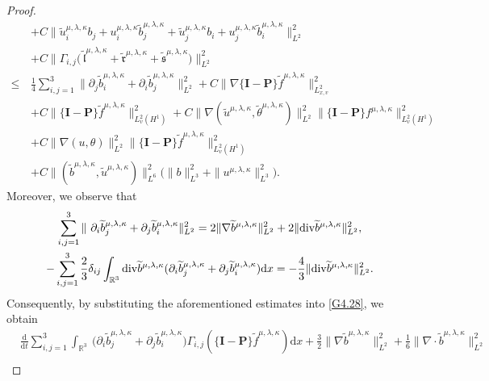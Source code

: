 \documentclass[reqno,11pt]{amsart}
\theoremstyle{plain}
\numberwithin{equation}{section}
\begin{document}
\begin{proof}
\begin{align*}
&+C\|\widetilde{u}^{\mu,\lambda,\kappa}_i b_j+u^{\mu,\lambda,\kappa}_i \widetilde{b}^{\mu,\lambda,\kappa}_j+\widetilde{u}^{\mu,\lambda,\kappa}_j b_i+u^{\mu,\lambda,\kappa}_j\widetilde{b}^{\mu,\lambda,\kappa}_i \|_{L^2}^2\nonumber\\
&+C\big\|\Gamma_{i, j}\big(\,\widetilde{\mathfrak{l}}^{\mu,\lambda,\kappa}+\widetilde{\mathfrak{r}}^{\mu,\lambda,\kappa}+\widetilde{\mathfrak{s}}^{\mu,\lambda,\kappa}\big)\big\|_{L^2}^2\nonumber\\
\leq\,&\frac{1}{4}\sum_{i, j=1}^3  \|  \partial_j \widetilde{b}^{\mu,\lambda,\kappa}_i+\partial_i \widetilde{b}^{\mu,\lambda,\kappa}_j  \|_{L^2}^2 +C\|\nabla \{\mathbf{I}-\mathbf{P}\} \widetilde{f}^{\mu,\lambda,\kappa}\|_{L_{x,v}^2}^2\nonumber\\
&+C\|\{\mathbf{I}-\mathbf{P}\} \widetilde{f}^{\mu,\lambda,\kappa}\|_{L_v^2(H^1)}^2+C\|\nabla(\widetilde{u}^{\mu,\lambda,\kappa},\widetilde{\theta}^{\mu,\lambda,\kappa})\|_{L^2}^2   \|\{\mathbf{I}-\mathbf{P}\}   {f}^{\mu,\lambda,\kappa} \|_{L_v^2(H^1)} ^2\nonumber\\
&+C\|\nabla(u,\theta)\|_{L^2}^2 \|  \{\mathbf{I}-\mathbf{P}\}  \widetilde{f}^{\mu,\lambda,\kappa} \|_{L_v^2(H^1)}^2\nonumber\\
&+C\|(\widetilde{b}^{\mu,\lambda,\kappa},\widetilde{u}^{\mu,\lambda,\kappa})\|_{L^6}^2\big(\|b\|_{L^3}^2+\|u^{\mu,\lambda,\kappa}\|_{L^3}^2\big).
\end{align*}
Moreover, we  observe that   
\begin{gather*}
  \sum_{i, j=1}^3 \|\ \partial_i \widetilde{b}^{\mu,\lambda,\kappa}_j+\partial_j \widetilde{b}^{\mu,\lambda,\kappa}_i \|_{L^2}^2 =2 \|\nabla   \widetilde{b}^{\mu,\lambda,\kappa} \|_{L^2}^2+2 \| {\rm div} \widetilde{b}^{\mu,\lambda,\kappa}\|_{L^2}^2, \\
 -\sum_{i, j=1}^3 \frac{2}{3} \delta_{i j} \int_{\mathbb{R}^3}   {\rm div}   \widetilde{b}^{\mu,\lambda,\kappa}  (\partial_i \widetilde{b}^{\mu,\lambda,\kappa}_j+\partial_j \widetilde{b}^{\mu,\lambda,\kappa}_i ) \mathrm{d} x 
=-\frac{4}{3} \|  {\rm div}   \widetilde{b}^{\mu,\lambda,\kappa} \|_{L^2}^2.
\end{gather*}
Consequently, by substituting the aforementioned estimates into \eqref{G4.28},  we obtain 
\begin{align}\label{G4.29}
& \frac{\mathrm{d}}{\mathrm{d} t}   \sum_{i, j=1}^3 \int_{\mathbb{R}^3} \ \big(\partial_i \widetilde{b}^{\mu,\lambda,\kappa}_j+\partial_j \widetilde{b}^{\mu,\lambda,\kappa}_i \big)   \Gamma_{i, j}(\{\mathbf{I}-\mathbf{P}\} \widetilde{f}^{\mu,\lambda,\kappa}) \mathrm{d} x  +   \frac{3}{2} \|\nabla   \widetilde{b}^{\mu,\lambda,\kappa}\|_{L^2}^2+\frac{1}{6} \|  \nabla  \cdot \widetilde{b}^{\mu,\lambda,\kappa}\|_{L^2}^2  \nonumber\\

\end{align}
\end{proof}
\end{document}
